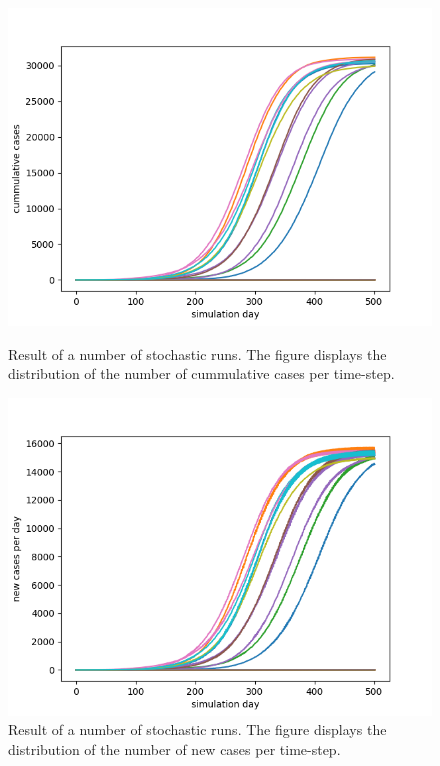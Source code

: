 \documentclass[runningheads]{llncs}
\begin{document}
\begin{figure}
	\includegraphics[width=\textwidth]{fig1.png}
	\caption{Result of a number of stochastic runs. The figure displays the distribution of the number of cummulative cases per time-step.} 	
	\label{fig1}

	\includegraphics[width=\textwidth]{fig2.png}
	\caption{Result of a number of stochastic runs. The figure displays the distribution of the number of new cases per time-step.} 
	\label{fig2}
\end{figure} 
\newpage
\end{document}
